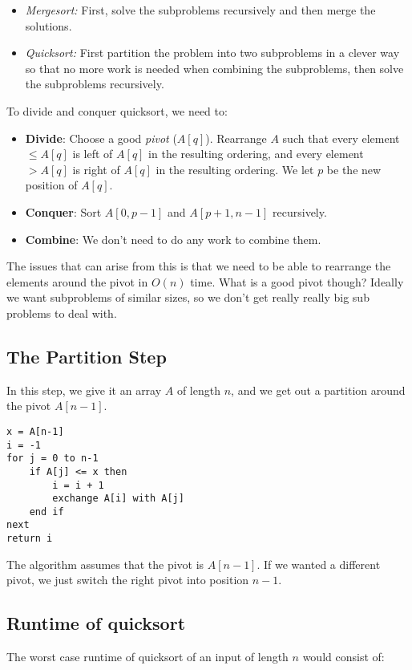 \documentclass[11pt,a4paper,titlepage,dvipsnames,cmyk]{scrartcl}
\begin{document}
\begin{itemize}
    \item \textit{Mergesort:} First, solve the subproblems recursively and
        then merge the solutions.
    \item \textit{Quicksort:} First partition the problem into two
        subproblems in a clever way so that no more work is needed when
        combining the subproblems, then solve the subproblems recursively. 
\end{itemize}

To divide and conquer quicksort, we need to:
\begin{itemize}
    \item \textbf{Divide}: Choose a good \textit{pivot} ($A[q]$).
        Rearrange $A$ such that every element $\le A[q]$ is left of $A[q]$
        in the resulting ordering, and every element $> A[q]$ is right of
        $A[q]$ in the resulting ordering. We let $p$ be the new position
        of $A[q]$.
    \item \textbf{Conquer}: Sort $A[0,p-1]$ and $A[p+1,n-1]$ recursively.
    \item \textbf{Combine}: We don't need to do any work to combine them.
\end{itemize}

The issues that can arise from this is that we need to be able to
rearrange the elements around the pivot in $O(n)$ time. What is a good
pivot though? Ideally we want subproblems of similar sizes, so we don't
get really really big sub problems to deal with.

\subsection{The Partition Step}%
\label{sub:The Partition Step}
In this step, we give it an array $A$ of length $n$, and we get out a
partition around the pivot $A[n-1]$.

\begin{lstlisting}
x = A[n-1]
i = -1
for j = 0 to n-1
    if A[j] <= x then
        i = i + 1
        exchange A[i] with A[j]
    end if
next
return i
\end{lstlisting}

The algorithm assumes that the pivot is $A[n-1]$. If we wanted a different
pivot, we just switch the right pivot into position $n-1$.

\subsection{Runtime of quicksort}%
\label{sub:Runtime of quicksort}
The worst case runtime of quicksort of an input of length $n$ would
consist of:
\end{document}
